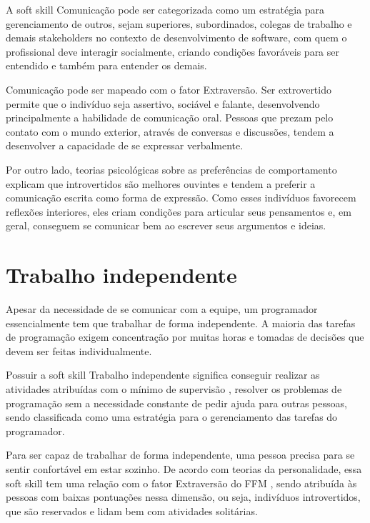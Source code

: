 A soft skill Comunicação pode ser categorizada como um estratégia para gerenciamento de outros, sejam superiores, subordinados, colegas de trabalho e demais stakeholders no contexto de desenvolvimento de software, com quem o profissional deve interagir socialmente, criando condições favoráveis para ser entendido e também para entender os demais.

Comunicação pode ser mapeado com o fator Extraversão. Ser extrovertido permite que o indivíduo seja assertivo, sociável e falante, desenvolvendo principalmente a habilidade de comunicação oral. Pessoas que prezam pelo contato com o mundo exterior, através de conversas e discussões, tendem a desenvolver a capacidade de se expressar verbalmente.

Por outro lado, teorias psicológicas sobre as preferências de comportamento \cite{myers:98} explicam que introvertidos são melhores ouvintes e tendem a preferir a comunicação escrita como forma de expressão. Como esses indivíduos favorecem reflexões interiores, eles criam condições para articular seus pensamentos e, em geral, conseguem se comunicar bem ao escrever seus argumentos e ideias.

\section{Trabalho independente}

Apesar da necessidade de se comunicar com a equipe, um programador essencialmente tem que trabalhar de forma independente. A maioria das tarefas de programação exigem concentração por muitas horas e tomadas de decisões que devem ser feitas individualmente.

Possuir a soft skill Trabalho independente significa conseguir realizar as atividades atribuídas com o mínimo de supervisão \cite{ahmed:12}, resolver os problemas de programação sem a necessidade constante de pedir ajuda para outras pessoas, sendo classificada como uma estratégia para o gerenciamento das tarefas do programador.

Para ser capaz de trabalhar de forma independente, uma pessoa precisa para se sentir confortável em estar sozinho. De acordo com teorias da personalidade, essa soft skill tem uma relação com o fator Extraversão do FFM \cite{rehman:12}, sendo atribuída às pessoas com baixas pontuações nessa dimensão, ou seja, indivíduos introvertidos, que são reservados e lidam bem com atividades solitárias.

